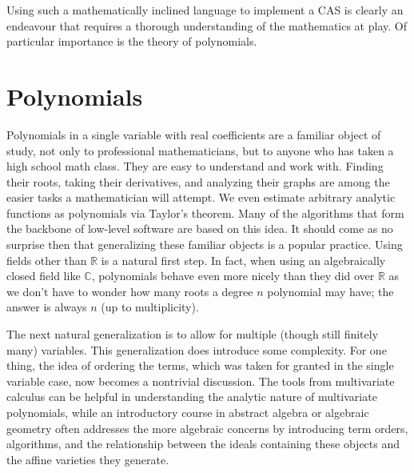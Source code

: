 \documentclass[MS, xcolor=dvipsnames]{wfuthesis}
\def\bC{\mathbb{C}}
\def\bR{\mathbb{R}}
\theoremstyle{definition}
\begin{document}
Using such a mathematically inclined language to implement a CAS is clearly an endeavour that requires a thorough understanding of the mathematics at play. Of particular importance is the theory of polynomials.


\section{Polynomials}
Polynomials in a single variable with real coefficients are a familiar object of study, not only to professional mathematicians, but to anyone who has taken a high school math class. They are easy to understand and work with. Finding their roots, taking their derivatives, and analyzing their graphs are among the easier tasks a mathematician will attempt. We even estimate arbitrary analytic functions as polynomials via Taylor's theorem. Many of the algorithms that form the backbone of low-level software are based on this idea. It should come as no surprise then that generalizing these familiar objects is a popular practice. Using fields other than $\bR$ is a natural first step. In fact, when using an algebraically closed field like $\bC$, polynomials behave even more nicely than they did over $\bR$ as we don't have to wonder how many roots a degree $n$ polynomial may have; the answer is always $n$ (up to multiplicity). \par
The next natural generalization is to allow for multiple (though still finitely many) variables. This generalization does introduce some complexity. For one thing, the idea of ordering the terms, which was taken for granted in the single variable case, now becomes a nontrivial discussion. The tools from multivariate calculus can be helpful in understanding the analytic nature of multivariate polynomials, while an introductory course in abstract algebra or algebraic geometry often addresses the more algebraic concerns by introducing term orders, algorithms, and the relationship between the ideals containing these objects and the affine varieties they generate.

\end{document}
